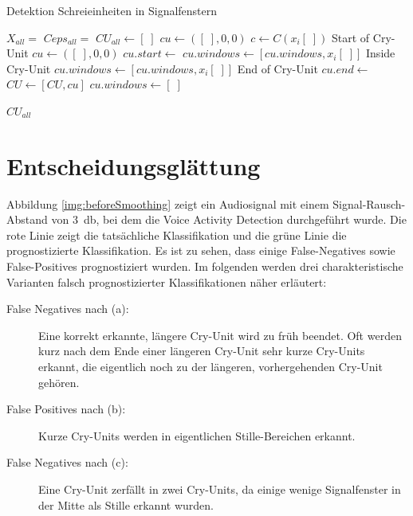 \begin{algorithm}[H]
	\caption{Detektion Schreieinheiten in Signalfenstern}
	\label{alg:cryUnit}
	\begin{algorithmic}[1]
		\State $X_{all} = $ 
		\State $Ceps_{all} =  $ 
		\State $ CU_{all} \gets [\;]$
		\State $ cu\gets ([\;],0,0)$
				\State $ c \gets C(x_i[\;])$
				\State \Comment Start of Cry-Unit
						\State $cu\gets ([\;],0,0)$
						\State $cu.start \gets $ 
						\State $cu.windows \gets [cu.windows, x_i[\;]]$
				\EndIf
				\State \Comment Inside Cry-Unit
						\State $cu.windows \gets [cu.windows, x_i[\;]]$
				\EndIf
				\State \Comment End of Cry-Unit
						\State $cu.end \gets $ 
						\State $CU \gets [CU, cu]$
						\State $cu.windows \gets [\;]$
				\EndIf
		\EndFor
		
		
		\Return $CU_{all}$
		
		\EndFunction
		
	\end{algorithmic}
\end{algorithm}


\section{Entscheidungsglättung}
\label{sec:decision_smoothing_new}

Abbildung \ref{img:beforeSmoothing} zeigt ein Audiosignal mit einem Signal-Rausch-Abstand von \SI{3}{\decibel}, bei dem die Voice Activity Detection durchgeführt wurde. Die rote Linie zeigt die tatsächliche Klassifikation und die grüne Linie die prognostizierte Klassifikation. Es ist zu sehen, dass einige False-Negatives sowie False-Positives prognostiziert wurden. Im folgenden werden drei charakteristische Varianten falsch prognostizierter Klassifikationen näher erläutert:

\begin{description}
	\item [False Negatives nach (a): ] Eine korrekt erkannte, längere Cry-Unit wird zu früh beendet. Oft werden kurz nach dem Ende einer längeren Cry-Unit sehr kurze Cry-Units erkannt, die eigentlich noch zu der längeren, vorhergehenden Cry-Unit gehören.
	\item [False Positives nach (b): ] Kurze Cry-Units werden in eigentlichen Stille-Bereichen erkannt.
	\item [False Negatives nach (c): ] Eine Cry-Unit zerfällt in zwei Cry-Units, da einige wenige Signalfenster in der Mitte als Stille erkannt wurden.
\end{description}

